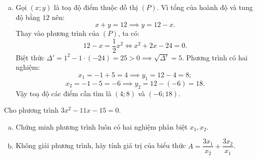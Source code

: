\begin{bt}
{\begin{enumerate}[a)]
\begin{center}
	\end{center}
	\item Gọi $(x; y)$ là toạ độ điểm thuộc đồ thị $(P)$.
	Vì tổng của hoành độ và tung độ bằng $12$ nên:
	$$x + y = 12 \implies y = 12 - x.$$
	Thay vào phương trình của $(P)$, ta có:
	$$12 - x = \dfrac{1}{2}x^2 \iff x^2 + 2x - 24 = 0.$$
	Biệt thức $\Delta' = 1^2 - 1 \cdot (-24) = 25 > 0 \implies \sqrt{\Delta'} = 5$.
	Phương trình có hai nghiệm:
	$$x_1 = -1 + 5 = 4 \implies y_1 = 12 - 4 = 8;$$
	$$x_2 = -1 - 5 = -6 \implies y_2 = 12 - (-6) = 18.$$
	Vậy toạ độ các điểm cần tìm là $(4; 8)$ và $(-6; 18)$.
\end{enumerate}
}
\end{bt}

\begin{bt}%
Cho phương trình $3x^2 - 11x - 15 = 0$.
\begin{enumerate}[a)]
	\item Chứng minh phương trình luôn có hai nghiệm phân biệt $x_1, x_2$.
	\item Không giải phương trình, hãy tính giá trị của biểu thức $A = \dfrac{3x_1}{x_2} + \dfrac{3x_2}{x_1}$.
\end{enumerate}
\end{bt}

